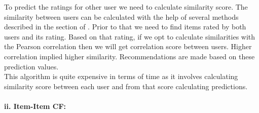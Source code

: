 \noindent To predict the ratings for other user we need to calculate similarity score. The similarity between users can be calculated with the help of several methods described in the section of . Prior to that we need to find items rated by both users and its rating. Based on that rating, if we opt to calculate similarities with the Pearson correlation then we will get correlation score between users. Higher correlation implied higher similarity. Recommendations are made based on these prediction values. 
\\
This algorithm is quite expensive in terms of time as it involves calculating similarity score between each user and from that score calculating predictions. 
\\
\noindent \paragraph{ii. Item-Item CF:}

